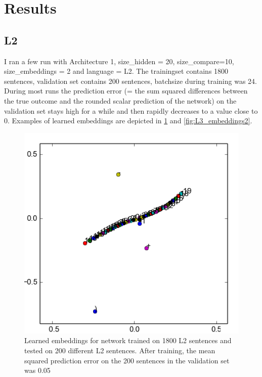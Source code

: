 \documentclass{article}
\begin{document}
\section{Results}

\subsection{L2}

I ran a few run with Architecture 1, size\_hidden = 20, size\_compare=10, size\_embeddings = 2 and language = L2. 
The trainingset contains 1800 sentences, validation set contains 200 sentences, batchsize during training was 24. 
During most runs the prediction error (= the sum squared differences between the true outcome and the rounded scalar prediction of the network) on the validation set stays high for a while and then rapidly decreases to a value close to 0. 
Examples of learned embeddings are depicted in \ref{fig:L3_embeddings} and \ref{fig:L3_embeddings2}.

\begin{figure}[!ht]
        \includegraphics[scale=0.9]{L2_embeddings.png}
        \caption{Learned embeddings for network trained on 1800 L2 sentences and tested on 200 different L2 sentences. After training, the mean squared prediction error on the 200 sentences in the validation set was 0.05}\label{fig:L3_embeddings}
\end{figure}
\end{document}
